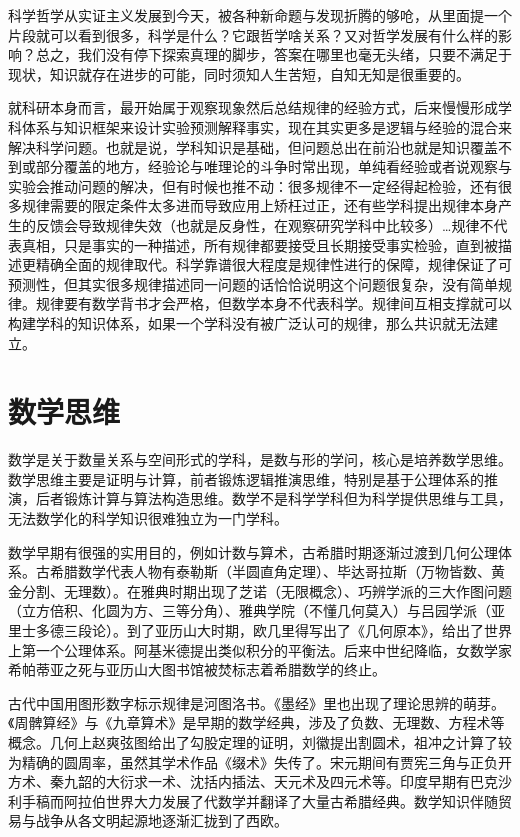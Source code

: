 \documentclass[]{tufte-book}
\begin{document}
科学哲学从实证主义发展到今天，被各种新命题与发现折腾的够呛，从里面提一个片段就可以看到很多，科学是什么？它跟哲学啥关系？又对哲学发展有什么样的影响？总之，我们没有停下探索真理的脚步，答案在哪里也毫无头绪，只要不满足于现状，知识就存在进步的可能，同时须知人生苦短，自知无知是很重要的。

就科研本身而言，最开始属于观察现象然后总结规律的经验方式，后来慢慢形成学科体系与知识框架来设计实验预测解释事实，现在其实更多是逻辑与经验的混合来解决科学问题。也就是说，学科知识是基础，但问题总出在前沿也就是知识覆盖不到或部分覆盖的地方，经验论与唯理论的斗争时常出现，单纯看经验或者说观察与实验会推动问题的解决，但有时候也推不动：很多规律不一定经得起检验，还有很多规律需要的限定条件太多进而导致应用上矫枉过正，还有些学科提出规律本身产生的反馈会导致规律失效（也就是反身性，在观察研究学科中比较多）\ldots 规律不代表真相，只是事实的一种描述，所有规律都要接受且长期接受事实检验，直到被描述更精确全面的规律取代。科学靠谱很大程度是规律性进行的保障，规律保证了可预测性，但其实很多规律描述同一问题的话恰恰说明这个问题很复杂，没有简单规律。规律要有数学背书才会严格，但数学本身不代表科学。规律间互相支撑就可以构建学科的知识体系，如果一个学科没有被广泛认可的规律，那么共识就无法建立。

\hypertarget{ux6570ux5b66ux601dux7ef4}{%
\section{数学思维}\label{ux6570ux5b66ux601dux7ef4}}

数学是关于数量关系与空间形式的学科，是数与形的学问，核心是培养数学思维。数学思维主要是证明与计算，前者锻炼逻辑推演思维，特别是基于公理体系的推演，后者锻炼计算与算法构造思维。数学不是科学学科但为科学提供思维与工具，无法数学化的科学知识很难独立为一门学科。

数学早期有很强的实用目的，例如计数与算术，古希腊时期逐渐过渡到几何公理体系。古希腊数学代表人物有泰勒斯（半圆直角定理）、毕达哥拉斯（万物皆数、黄金分割、无理数）。在雅典时期出现了芝诺（无限概念）、巧辨学派的三大作图问题（立方倍积、化圆为方、三等分角）、雅典学院（不懂几何莫入）与吕园学派（亚里士多德三段论）。到了亚历山大时期，欧几里得写出了《几何原本》，给出了世界上第一个公理体系。阿基米德提出类似积分的平衡法。后来中世纪降临，女数学家希帕蒂亚之死与亚历山大图书馆被焚标志着希腊数学的终止。

古代中国用图形数字标示规律是河图洛书。《墨经》里也出现了理论思辨的萌芽。《周髀算经》与《九章算术》是早期的数学经典，涉及了负数、无理数、方程术等概念。几何上赵爽弦图给出了勾股定理的证明，刘徽提出割圆术，祖冲之计算了较为精确的圆周率，虽然其学术作品《缀术》失传了。宋元期间有贾宪三角与正负开方术、秦九韶的大衍求一术、沈括内插法、天元术及四元术等。印度早期有巴克沙利手稿而阿拉伯世界大力发展了代数学并翻译了大量古希腊经典。数学知识伴随贸易与战争从各文明起源地逐渐汇拢到了西欧。
\end{document}
